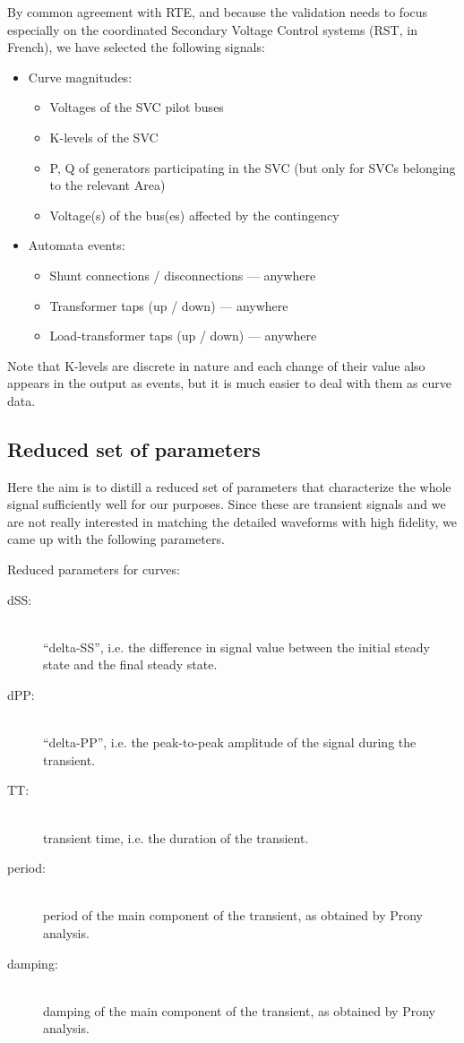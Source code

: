 \documentclass[11pt, a4paper, twoside, titlepage]{article}
\begin{document}
By common agreement with RTE, and because the validation needs to
focus especially on the coordinated Secondary Voltage Control systems
(RST, in French), we have selected the following signals:
\begin{itemize}
\item Curve magnitudes:
  \begin{itemize}
  \item Voltages of the SVC pilot buses
  \item K-levels of the SVC
  \item P, Q of generators participating in the SVC (but only for SVCs belonging
    to the relevant Area)
  \item Voltage(s) of the bus(es) affected by the contingency 
  \end{itemize}
\item Automata events:
  \begin{itemize}
  \item Shunt connections / disconnections --- anywhere
  \item Transformer taps (up / down) --- anywhere
  \item Load-transformer taps (up / down) --- anywhere
  \end{itemize}  
\end{itemize}

Note that K-levels are discrete in nature and each change of their value also
appears in the output as events, but it is much easier to deal with them as
curve data.


\subsection{Reduced set of parameters}

Here the aim is to distill a reduced set of parameters that characterize the
whole signal sufficiently well for our purposes. Since these are transient
signals and we are not really interested in matching the detailed waveforms with
high fidelity, we came up with the following parameters.

Reduced parameters for curves:

\begin{description}
\item[dSS:] \hfill \\ ``delta-SS'', i.e. the difference in signal value between
  the initial steady state and the final steady state.
\item[dPP:] \hfill \\ ``delta-PP'', i.e. the peak-to-peak amplitude of the
  signal during the transient.
\item[TT:] \hfill \\ transient time, i.e. the duration of the transient.
\item[period:] \hfill \\ period of the main component of the transient, as
  obtained by Prony analysis.
\item[damping:] \hfill \\ damping of the main component of the transient, as
  obtained by Prony analysis.
\end{description}
\end{document}
